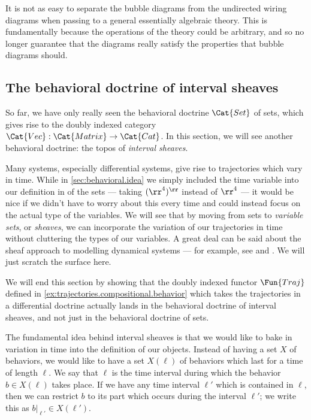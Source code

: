 \documentclass[DynamicalBook]{subfiles}
\begin{document}
          \begin{remark}
            It is not as easy to separate the bubble diagrams from the undirected wiring diagrams when passing to a general essentially algebraic theory. This is fundamentally because the operations of the theory could be arbitrary, and so no longer guarantee that the diagrams really satisfy the properties that bubble diagrams should.
          \end{remark}



\subsection{The behavioral doctrine of interval sheaves}\label{sec:behavioral.types}

So far, we have only really seen the behavioral doctrine $\Cat{Set}$ of sets, which gives rise to the doubly indexed category $\Cat{Vec} : \Cat{Matrix} \to \Cat{Cat}$. In this section, we will see another behavioral doctrine: the topos of \emph{interval sheaves}.

Many systems, especially differential systems, give rise to trajectories which vary in time. While in \cref{sec:behavioral.idea} we simply included the time variable into our definition in of the sets --- taking $(\rr^{4})^{\rr}$ instead of $\rr^{4}$ --- it would be nice if we didn't have to worry about this every time and could instead focus on the actual type of the variables. We will see that by moving from sets to \emph{variable sets}, or \emph{sheaves}, we can incorporate the variation of our trajectories in time without cluttering the types of our variables.
A great deal can be said about the sheaf approach to modelling dynamical systems --- for example, see \cite{schultz2016dynamical} and \cite{schultz2019temporal}. We will just scratch the surface here.

We will end this section by showing that the doubly indexed functor $\Fun{Traj}$ defined in \cref{ex:trajectories.compositional.behavior} which takes the trajectories in a differential doctrine actually lands in the behavioral doctrine of interval sheaves, and not just in the behavioral doctrine of sets.

The fundamental idea behind interval sheaves is that we would like to bake in variation in time into the definition of our objects. Instead of having a set $X$ of behaviors, we would like to have a set $X(\ell)$ of behaviors which last for a time of length $\ell$.  We say that $\ell$ is the time interval during which the behavior $b \in X(\ell)$ takes place. If we have any time interval $\ell'$ which is contained in $\ell$, then we can restrict $b$ to its part which occurs during the interval $\ell'$; we write this as $b|_{\ell'} \in X(\ell')$.
\end{document}
